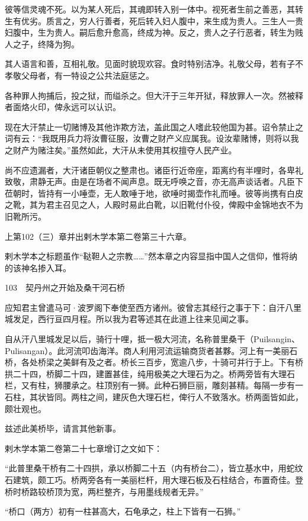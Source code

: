 \documentclass[12pt,UTF8]{ctexbook}
\begin{document}
彼等信灵魂不死。以为某人死后，其魂即转入别一体中。视死者生前之善恶，其转生有优劣。质言之，穷人行善者，死后转入妇人腹中，来生成为贵人。三生人一贵妇腹中，生为贵人。嗣后愈升愈高，终成为神。反之，贵人之子行恶者，转生为贱人之子，终降为狗。

其人语言和善，互相礼敬。见面时貌现欢容。食时特别洁净。礼敬父母，若有子不孝敬父母者，有一特设之公共法庭惩之。

各种罪人拘捕后，投之狱，而缢杀之。但大汗于三年开狱，释放罪人一次。然被释者面烙火印，俾永远可以认识。

现在大汗禁止一切赌博及其他诈欺方法，盖此国之人嗜此较他国为甚。诏令禁止之词有云：“我既用兵力将汝曹征服，汝曹之财产义应属我。设汝辈赌博，则将以我之财产为赌注矣。”虽然如此，大汗从未使用其权擅夺人民产业。

尚不应遗漏者，大汗诸臣朝仪之整肃也。诸臣行近帝座，距离约有半哩时，各卑礼致敬，肃静无声。由是在场者不闻声息。既无呼唤之音，亦无高声谈话者。凡臣下莅朝时，皆持有一小唾壶，无人敢唾于地，欲唾时揭壶作礼而唾。彼等尚携有白皮之靴，其为君主召见之人，人殿时易此白靴，以旧靴付仆役，俾殿中金锦地衣不为旧靴所污。

上第102（三）章并出剌木学本第二卷第三十六章。

剌木学本之标题虽作“鞑靼人之宗教……”然本章之内容显指中国人之信仰，惟将纳的该神名掺入耳。





103　契丹州之开始及桑干河石桥

应知君主曾遣马可·波罗阁下奉使至西方诸州。彼曾志其经行之事于下：自汗八里城发足，西行亘四月程。所以我为君等述其在此道上往来见闻之事。

自从汗八里城发足以后，骑行十哩，抵一极大河流，名称普里桑干（Puilsangin、Pulisangan）。此河流叩齿海洋。商人利用河流运输商货者甚夥。河上有一美丽石桥，各处桥梁之美鲜有及之者。桥长三百步，宽逾八步，十骑可并行于上。下有桥拱二十四，桥脚二十四，建置甚佳，纯用极美之大理石为之。桥两旁皆有大理石栏，又有柱，狮腰承之。柱顶别有一狮。此种石狮巨丽，雕刻甚精。每隔一步有一石柱，其状皆同。两柱之间，建灰色大理石栏，俾行人不致落水。桥两面皆如此，颇壮观也。

兹述此美桥毕，请言其他新事。

剌木学本第二卷第二十七章增订之文如下：

“此普里桑干桥有二十四拱，承以桥脚二十五（内有桥台二），皆立基水中，用蛇纹石建筑，颇工巧。桥两旁各有一美丽栏杆，用大理石板及石柱结合，布置奇佳。登桥时桥路较桥顶为宽，两栏整齐，与用墨线规者无异。”

“桥口（两方）初有一柱甚高大，石龟承之，柱上下皆有一石狮。”
\end{document}
